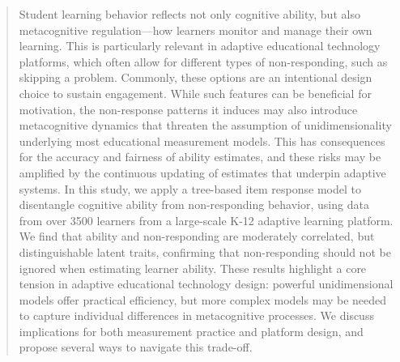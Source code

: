 \documentclass[12pt]{article}
\begin{document}
\begin{abstract}

Student learning behavior reflects not only cognitive ability, but also metacognitive regulation---how learners monitor and manage their own learning. This is particularly relevant in adaptive educational technology platforms, which often allow for different types of non-responding, such as skipping a problem. Commonly, these options are an intentional design choice to sustain engagement. While such features can be beneficial for motivation, the non-response patterns it induces may also introduce metacognitive dynamics that threaten the assumption of unidimensionality underlying most educational measurement models. This has consequences for the accuracy and fairness of ability estimates, and these risks may be amplified by the continuous updating of estimates that underpin adaptive systems. %
In this study, we apply a tree-based item response model to disentangle cognitive ability from non-responding behavior, using data from over \num{3500} learners from a large-scale K-12 adaptive learning platform. We find that ability and non-responding are moderately correlated, but distinguishable latent traits, confirming that non-responding should not be ignored when estimating learner ability. These results highlight a core tension in adaptive educational technology design: powerful unidimensional models offer practical efficiency, but more complex models may be needed to capture individual differences in metacognitive processes. We discuss implications for both measurement practice and platform design, and propose several ways to navigate this trade-off. 
 

\end{abstract}
\end{document}
